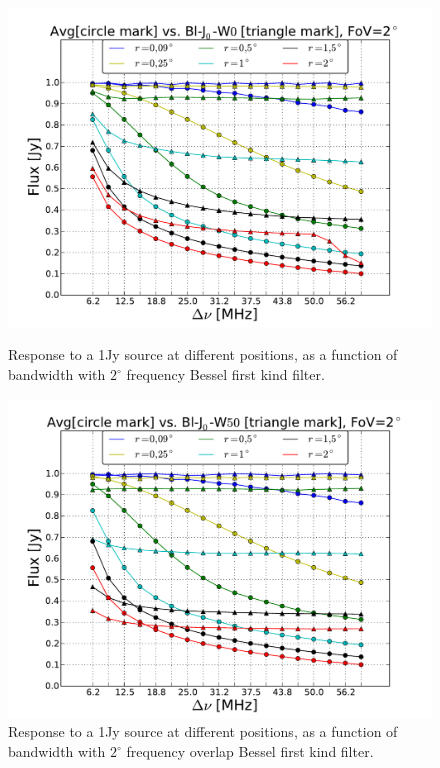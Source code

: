 \documentclass[useAMS,usenatbib]{mn2e}
\begin{document}
\begin{figure}
\begin{minipage}{0.36\linewidth}
      \label{fig:max-integ-freq-sinc-w1x50-fov2}
      \end{minipage}\\
\begin{minipage}{0.36\linewidth}\includegraphics[width=1\textwidth]{./Figures/max-integ-freq-bessel-w1x1-fov2.pdf}
      \caption{Response to a 1Jy source at different positions, as a function of bandwidth with $2^{\circ}$ frequency Bessel first kind 
filter.}
      \label{fig:max-integ-freq-bessel-w1x1-fov2}
      \end{minipage}
\hspace{1cm}
\begin{minipage}{0.36\linewidth}\includegraphics[width=1\textwidth]{./Figures/max-integ-freq-bessel-w1x50-fov2.pdf}
      \caption{Response to a 1Jy source at different positions, as a function of bandwidth with $2^{\circ}$ frequency overlap Bessel first 
kind filter.}
      \label{fig:max-integ-freq-bessel-w1x50-fov2}
      \end{minipage}
\end{figure}
\end{document}
